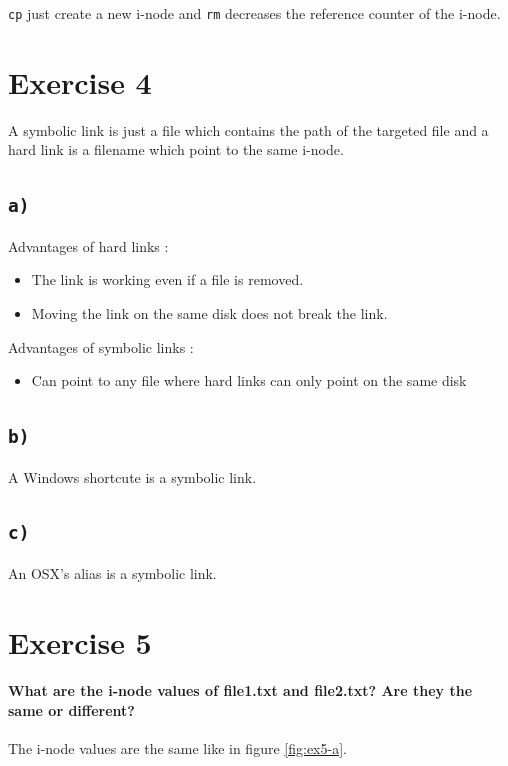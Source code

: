 \documentclass[a4paper,11pt]{report}
\begin{document}
\verb+cp+ just create a new i-node and \verb+rm+ decreases the reference counter
of the i-node.

\section*{Exercise 4}

A symbolic link is just a file which contains the path of the targeted file and
a hard link is a filename which point to the same i-node.

\subsection*{\texttt{a)}}

Advantages of hard links :
\begin{itemize}
\item The link is working even if a file is removed.
\item Moving the link on the same disk does not break the link.
\end{itemize}

Advantages of symbolic links :
\begin{itemize}
\item Can point to any file where hard links can only point on the same disk
\end{itemize}

\subsection*{\texttt{b)}}

A Windows shortcute is a symbolic link.

\subsection*{\texttt{c)}}

An OSX's alias is a symbolic link.

\section*{Exercise 5}

\paragraph{What are the i-node values of file1.txt and file2.txt? Are they the
  same or different?}

The i-node values are the same like in figure \ref{fig:ex5-a}.
\end{document}

